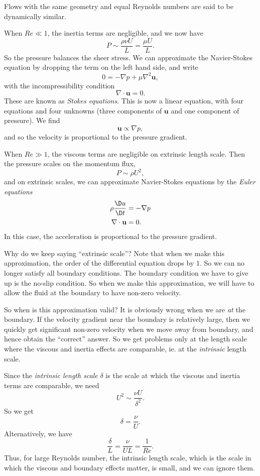 \documentclass[a4paper]{article}
\begin{document}
\begin{defi}
  Flows with the same geometry and equal Reynolds numbers are said to be dynamically similar.
\end{defi}

When $Re \ll 1$, the inertia terms are negligible, and we now have
\[
  P \sim \frac{\rho\nu U}{L} = \frac{\mu U}{L}.
\]
So the pressure balances the sheer stress. We can approximate the Navier-Stokes equation by dropping the term on the left hand side, and write
\[
  0 = -\nabla p + \mu \nabla^2 \mathbf{u},
\]
with the incompressibility condition
\[
  \nabla \cdot \mathbf{u} = 0.
\]
These are known as \emph{Stokes equations}. This is now a linear equation, with four equations and four unknowns (three components of $\mathbf{u}$ and one component of pressure). We find
\[
  \mathbf{u} \propto \nabla p,
\]
and so the velocity is proportional to the pressure gradient.

When $Re \gg 1$, the viscous terms are negligible on extrinsic length scale. Then the pressure scales on the momentum flux,
\[
  P \sim \rho U^2,
\]
and on extrinsic scales, we can approximate Navier-Stokes equations by the \emph{Euler equations}
\begin{align*}
  \rho \frac{\D u}{\D t} &= - \nabla p\\
  \nabla \cdot \mathbf{u} &= 0.
\end{align*}
In this case, the acceleration is proportional to the pressure gradient.

Why do we keep saying ``extrinsic scale''? Note that when we make this approximation, the order of the differential equation drops by $1$. So we can no longer satisfy all boundary conditions. The boundary condition we have to give up is the no-slip condition. So when we make this approximation, we will have to allow the fluid at the boundary to have non-zero velocity.

So when is this approximation valid? It is obviously wrong when we are \emph{at} the boundary. If the velocity gradient near the boundary is relatively large, then we quickly get significant non-zero velocity when we move away from boundary, and hence obtain the ``correct'' answer. So we get problems only at the length scale where the viscous and inertia effects are comparable, ie. at the \emph{intrinsic} length scale.

Since the \emph{intrinsic length scale} $\delta$ is the scale at which the viscous and inertia terms are comparable, we need
\[
  U^2 \sim \frac{\nu U}{\delta^2}.
\]
So we get
\[
  \delta = \frac{\nu}{U}.
\]
Alternatively, we have
\[
  \frac{\delta}{L} = \frac{\nu}{UL} = \frac{1}{Re}.
\]
Thus, for large Reynolds number, the intrinsic length scale, which is the scale in which the viscous and boundary effects matter, is small, and we can ignore them.
\end{document}
